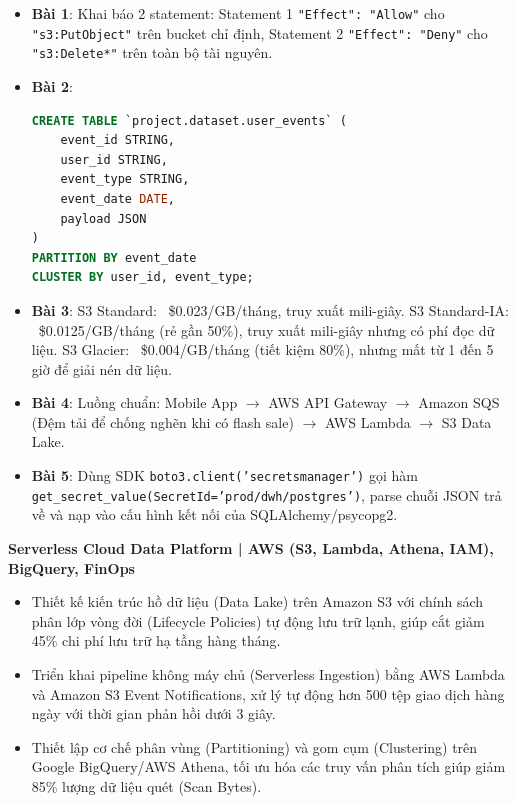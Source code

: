 \begin{dapanbox}
\begin{itemize}
    \item \textbf{Bài 1}: Khai báo 2 statement: Statement 1 \texttt{"Effect": "Allow"} cho \texttt{"s3:PutObject"} trên bucket chỉ định, Statement 2 \texttt{"Effect": "Deny"} cho \texttt{"s3:Delete*"} trên toàn bộ tài nguyên.
    \item \textbf{Bài 2}:
    \begin{lstlisting}[language=SQL]
CREATE TABLE `project.dataset.user_events` (
    event_id STRING,
    user_id STRING,
    event_type STRING,
    event_date DATE,
    payload JSON
)
PARTITION BY event_date
CLUSTER BY user_id, event_type;
    \end{lstlisting}
    \item \textbf{Bài 3}: S3 Standard: ~\$0.023/GB/tháng, truy xuất mili-giây. S3 Standard-IA: ~\$0.0125/GB/tháng (rẻ gần 50\%), truy xuất mili-giây nhưng có phí đọc dữ liệu. S3 Glacier: ~\$0.004/GB/tháng (tiết kiệm 80\%), nhưng mất từ 1 đến 5 giờ để giải nén dữ liệu.
    \item \textbf{Bài 4}: Luồng chuẩn: Mobile App $\rightarrow$ AWS API Gateway $\rightarrow$ Amazon SQS (Đệm tải để chống nghẽn khi có flash sale) $\rightarrow$ AWS Lambda $\rightarrow$ S3 Data Lake.
    \item \textbf{Bài 5}: Dùng SDK \texttt{boto3.client('secretsmanager')} gọi hàm \texttt{get\_secret\_value(SecretId='prod/dwh/postgres')}, parse chuỗi JSON trả về và nạp vào cấu hình kết nối của SQLAlchemy/psycopg2.
\end{itemize}
\end{dapanbox}

\begin{cvtipbox}
\textbf{Serverless Cloud Data Platform | AWS (S3, Lambda, Athena, IAM), BigQuery, FinOps}
\begin{itemize}
    \item Thiết kế kiến trúc hồ dữ liệu (Data Lake) trên Amazon S3 với chính sách phân lớp vòng đời (Lifecycle Policies) tự động lưu trữ lạnh, giúp cắt giảm 45\% chi phí lưu trữ hạ tầng hàng tháng.
    \item Triển khai pipeline không máy chủ (Serverless Ingestion) bằng AWS Lambda và Amazon S3 Event Notifications, xử lý tự động hơn 500 tệp giao dịch hàng ngày với thời gian phản hồi dưới 3 giây.
    \item Thiết lập cơ chế phân vùng (Partitioning) và gom cụm (Clustering) trên Google BigQuery/AWS Athena, tối ưu hóa các truy vấn phân tích giúp giảm 85\% lượng dữ liệu quét (Scan Bytes).
\end{itemize}
\end{cvtipbox}
